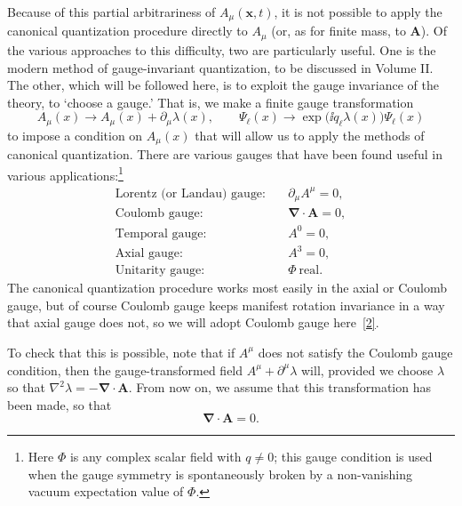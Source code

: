 Because of this partial arbitrariness of $A_\mu(\mathbf x,t)$, it is not possible
to apply the canonical quantization procedure directly to $A_\mu$ (or, as for
finite mass, to $\mathbf A$). Of the various approaches to this difficulty, two
are particularly useful. One is the modern method of gauge-invariant
quantization, to be discussed in Volume II. The other, which will be followed
here, is to exploit the gauge invariance of the theory, to `choose a gauge.'
That is, we make a finite gauge transformation
\[
  A_\mu(x)\longrightarrow A_\mu(x)+\partial_\mu\lambda(x),
  \qquad
  \Psi_\ell(x)\longrightarrow\exp\!\bigl(\ii q_\ell\lambda(x)\bigr)\Psi_\ell(x)
\]
to impose a condition on $A_\mu(x)$ that will allow us to apply the methods
of canonical quantization. There are various gauges that have been found
useful in various applications:\footnote{Here $\Phi$ is any complex scalar
field with $q\ne0$; this gauge condition is used when the gauge symmetry is
spontaneously broken by a non-vanishing vacuum expectation value of $\Phi$.}
\begin{align*}
  \text{Lorentz (or Landau) gauge:}\quad&\partial_\mu A^\mu=0,\\
  \text{Coulomb gauge:}\quad&\boldsymbol\nabla\cdot\mathbf A=0,\\
  \text{Temporal gauge:}\quad&A^0=0,\\
  \text{Axial gauge:}\quad&A^3=0,\\
  \text{Unitarity gauge:}\quad&\Phi\ \text{real}.
\end{align*}
The canonical quantization procedure works most easily in the axial or
Coulomb gauge, but of course Coulomb gauge keeps manifest rotation
invariance in a way that axial gauge does not, so we will adopt Coulomb
gauge here~\hyperref[ref:8.2]{[2]}.

To check that this is possible, note that if $A^\mu$ does not satisfy the
Coulomb gauge condition, then the gauge-transformed field
$A^\mu+\partial^\mu\lambda$ will, provided we choose $\lambda$ so that
$\nabla^2\lambda=-\boldsymbol\nabla\cdot\mathbf A$. From now on, we assume
that this transformation has been made, so that
\begin{equation}
  \boldsymbol\nabla\cdot\mathbf A=0.
  \tag{8.2.6}\label{eq:8.2.6}
\end{equation}

